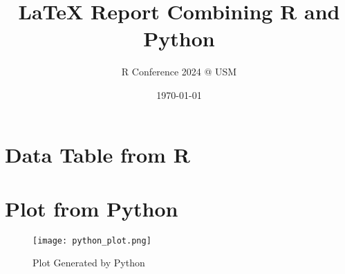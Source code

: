 \documentclass{article}
\title{\LaTeX{} Report Combining R and Python}
\author{R Conference 2024 @ USM}
\date{\today}
\begin{document}
\maketitle

\section{Data Table from R}



\section{Plot from Python}
\begin{figure}[H]
    \centering
    \texttt{[image: python\_plot.png]}
    \caption{Plot Generated by Python}
\end{figure}
\end{document}
